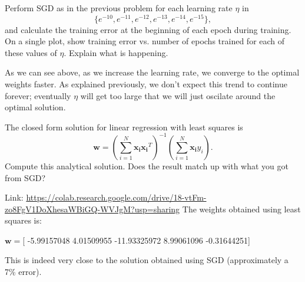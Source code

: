\begin{problem}[2]
  Perform SGD as in the previous problem for each learning rate $\eta$ in \[\{e^{-10}, e^{-11}, e^{-12}, e^{-13}, e^{-14}, e^{-15}\},\] and calculate the training error at the beginning of each epoch during training.  On a single plot, show training error vs. number of epochs trained for each of these values of $\eta$. Explain what is happening.
\end{problem}
\begin{solution}
  \begin{figure}[H]
   \end{figure}
   As we can see above, as we increase the learning rate, we converge to the optimal weights faster. As explained previously, we don't expect this trend to continue forever; eventually $\eta$ will get too large that we will just oscilate around the optimal solution.
\end{solution}


\begin{problem}[2]
  The closed form solution for linear regression with least squares is \[\mathbf{w} = \left(\sum_{i=1}^N \mathbf{x_i}\mathbf{x_i}^T\right)^{-1}\left(\sum_{i=1}^N \mathbf{x_i}y_i\right).\]  Compute this analytical solution.  Does the result match up with what you got from SGD?
\end{problem}
\begin{solution}
  Link: \url{https://colab.research.google.com/drive/18-vtFm-zo8FgV1DoXhesaWBiGQ-WVJgM?usp=sharing}
 The weights obtained using least squares is:

 $\mathbf{w}=$[ -5.99157048   4.01509955 -11.93325972   8.99061096  -0.31644251]

 This is indeed very close to the solution obtained using SGD (approximately a 7\% error).
\end{solution}

